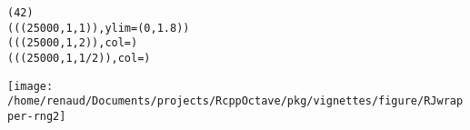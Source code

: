\begin{knitrout}
\begin{kframe}
\begin{alltt}
(42)
(((25000,1,1)), ylim=(0,1.8))
(((25000,1,2)), col=)
(((25000,1,1/2)), col=)
\end{alltt}
\end{kframe}
\texttt{[image: /home/renaud/Documents/projects/RcppOctave/pkg/vignettes/figure/RJwrapper-rng2]} 

\end{knitrout}





\address{Dirk Eddelbuettel \\
  River Forest, IL\\
  USA}\\

\address{Renaud Gaujoux \\
  Computational Biology \\
  University of Cape Town \\
  Cape Town \\
  South Africa}\\

